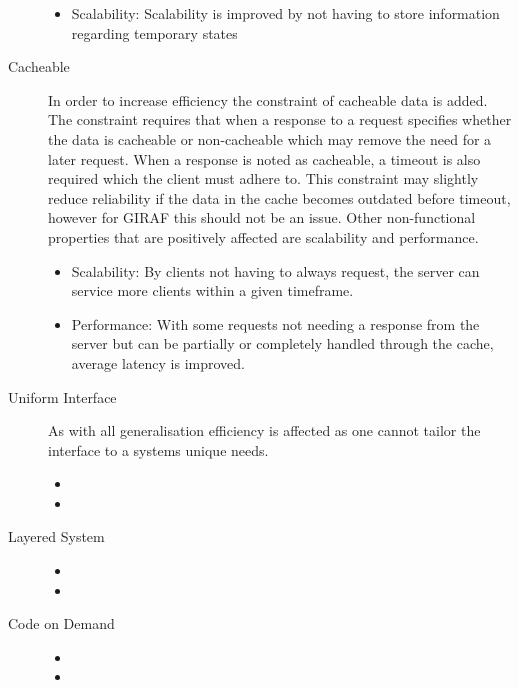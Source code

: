 \begin{description}
\begin{itemize}
        \item Scalability: Scalability is improved by not having to store information regarding temporary states
    \end{itemize}
    \item [Cacheable] 
    In order to increase efficiency the constraint of cacheable data is added.
    The constraint requires that when a response to a request specifies whether the data is cacheable or non-cacheable which may remove the need for a later request.
    When a response is noted as cacheable, a timeout is also required which the client must adhere to.
    This constraint may slightly reduce reliability if the data in the cache becomes outdated before timeout, however for GIRAF this should not be an issue.
    Other non-functional properties that are positively affected are scalability and performance.
    \begin{itemize}
        \item Scalability: By clients not having to always request, the server can service more clients within a given timeframe.
        \item Performance: With some requests not needing a response from the server but can be partially or completely handled through the cache, average latency is improved.
    \end{itemize}
    \item [Uniform Interface] 
    As with all generalisation efficiency is affected as one cannot tailor the interface to a systems unique needs.
    \begin{itemize}
        \item 
        \item 
    \end{itemize}
    \item [Layered System]
    \begin{itemize}
        \item 
        \item 
    \end{itemize} 
    \item [Code on Demand] 
    \begin{itemize}
        \item 
        \item 
    \end{itemize} 
\end{description}